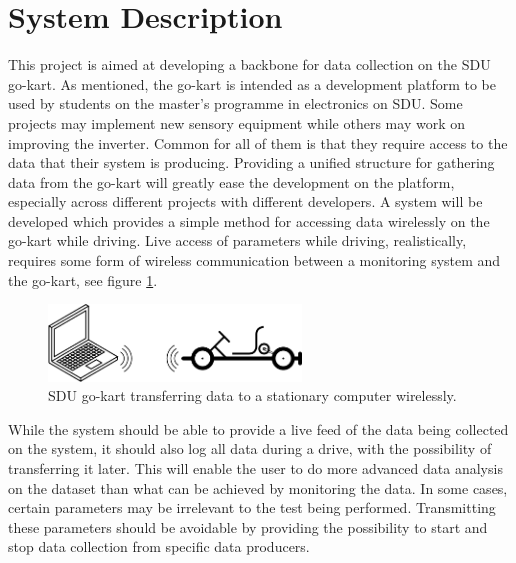 \section{System Description}
\label{sec:system_description}
This project is aimed at developing a backbone for data collection on the SDU go-kart.
As mentioned, the go-kart is intended as a development platform to be used by students on the master's programme in electronics on SDU.
Some projects may implement new sensory equipment while others may work on improving the inverter.
Common for all of them is that they require access to the data that their system is producing.
Providing a unified structure for gathering data from the go-kart will greatly ease the development on the platform, especially across different projects with different developers.
A system will be developed which provides a simple method for accessing data wirelessly on the go-kart while driving.
Live access of parameters while driving, realistically, requires some form of wireless communication between a monitoring system and the go-kart, see figure \ref{fig:simple}.

\begin{figure}[h]
 	\centering
    \includegraphics[width=0.6\textwidth]{graphics/go_kart_network_simple}
    \caption{SDU go-kart transferring data to a stationary computer wirelessly.}
    \label{fig:simple}
\end{figure}

While the system should be able to provide a live feed of the data being collected on the system, it should also log all data during a drive, with the possibility of transferring it later.
This will enable the user to do more advanced data analysis on the dataset than what can be achieved by monitoring the data.
In some cases, certain parameters may be irrelevant to the test being performed.
Transmitting these parameters should be avoidable by providing the possibility to start and stop data collection from specific data producers.

